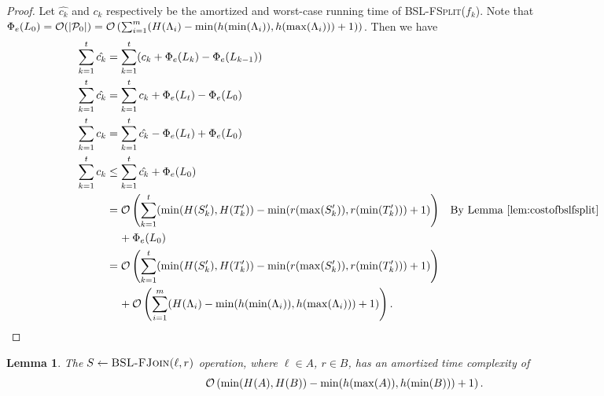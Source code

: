 \documentclass[11pt]{article}
\newcommand{\Bslfsplx}[1]{\mbox{\textsc{BSL-FSplit(\ensuremath{#1})}}}
\newcommand{\Bslfjoinx}[2]{\mbox{\textsc{BSL-FJoin(\ensuremath{#1,#2})}}}
\newcommand{\nodeheight}[1]{\ensuremath{h(#1)}}
\newcommand{\intheight}[1]{\ensuremath{H(#1)}}
\newcommand{\intmax}[1]{\ensuremath{\max(\intl #1)}}
\newcommand{\intmin}[1]{\ensuremath{\min(\intl #1)}}
\newcommand{\intl}[1]{\ensuremath{#1}}
\newcommand{\beforeop}[1]{\ensuremath{#1'}}
\newcommand{\noderank}[1]{\ensuremath{r(\node #1)}}
\newcommand{\node}[1]{\ensuremath{#1}}
\newcommand{\bsl}[1]{\ensuremath{#1}}
\newcommand{\indatast}[1]{\ensuremath{L_{#1}}}
\newcommand{\locpotfun}[1]{\ensuremath{\Phi_{e}(#1)}}
\newcommand{\plats}[1]{\ensuremath{\mathcal P_{#1}}}
\newcommand{\amcost}[1]{\ensuremath{\hat{c_{#1}}}}
\newcommand{\actcost}[1]{\ensuremath{c_{#1}}}
\newcommand{\initbsl}[1]{\ensuremath{\Lambda_{#1}}}
\newcounter{count}
\newtheorem{lemma}[count]{Lemma}
\begin{document}
\begin{proof} 
Let \amcost k and \actcost k respectively be the amortized and worst-case running time of \Bslfsplx{f_k}. Note that $\locpotfun{\indatast 0} = \mathcal O(|\plats 0|) = \mathcal O\left(\sum_{i=1}^{m}(\intheight{\initbsl i} - \min(\nodeheight{\intmin{\initbsl i}},\nodeheight{\intmax{\initbsl i}})+1)\right)$. Then we have 
{\allowdisplaybreaks 
\begin{align*} 
\sum_{k=1}^{t} \amcost{k} &= \sum_{k=1}^{t} (\actcost k + \locpotfun{\indatast k} - \locpotfun{\indatast{k-1}})\\ 
\sum_{k=1}^{t} \amcost{k} &=\sum_{k=1}^{t} \actcost k + \locpotfun{\indatast{t}} - \locpotfun{\indatast{0}}\\ 
\sum_{k=1}^{t} \actcost k &=\sum_{k=1}^{t} \amcost{k} - \locpotfun{\indatast{t}}+ \locpotfun{\indatast{0}}\\ 
\sum_{k=1}^{t} \actcost k &\leq\sum_{k=1}^{t} \amcost{k} + \locpotfun{\indatast{0}}\\ 
&= \mathcal O\left(\sum_{k=1}^t (\min(\intheight{\beforeop{S_k}},\intheight{\beforeop{T_k}}) - \min(\noderank{\intmax{\beforeop{S_k}}},\noderank{\intmin{\beforeop{T_k}}})+1)\right)&& \mbox{By Lemma}~\ref{lem:costofbslfsplit}\\ 
& \hspace{4mm} + \locpotfun{\indatast{0}}\\ 
&= \mathcal O\left(\sum_{k=1}^t (\min(\intheight{\beforeop{S_k}},\intheight{\beforeop{T_k}}) - \min(\noderank{\intmax{\beforeop{S_k}}},\noderank{\intmin{\beforeop{T_k}}})+1)\right)\\ 
& \hspace{4mm}  +\mathcal O\left(\sum_{i=1}^{m}(\intheight{\initbsl i} - \min(\nodeheight{\intmin{\initbsl i}},\nodeheight{\intmax{\initbsl i}})+1)\right). 
\end{align*} 
} 
\end{proof} 


\begin{lemma} 
\label{lem:costofbslfjoin} 
The $\bsl S \leftarrow \Bslfjoinx{\ell}{r}$ operation, where $\ell\in A$, $r\in B$, has an amortized time complexity of 
\[{\cal O}\left(\min(\intheight{A},\intheight{B}) - \min(\nodeheight{\intmax{A}}, \nodeheight{\intmin{B}})+1\right).\]  
\end{lemma} 
\end{document}
